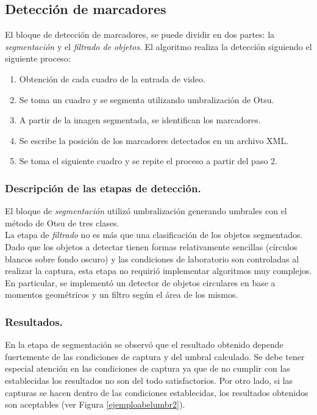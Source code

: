\subsection{Detección de marcadores}
El bloque de detección de marcadores, se puede dividir en dos partes: la \textit{segmentación} y el \textit{filtrado de objetos}.
%
El algoritmo realiza la detección siguiendo el siguiente proceso:
%
\begin{enumerate}
  \item Obtención de cada cuadro de la entrada de video.
  \item Se toma un cuadro y se segmenta utilizando umbralización de Otsu.
  \item A partir de la imagen segmentada, se identifican los marcadores.
  \item Se escribe la posición de los marcadores detectados en un archivo XML.
  \item Se toma el siguiente cuadro y se repite el proceso a partir del paso 2.
\end{enumerate}
\vspace{-0.4cm} 
\subsubsection{Descripción de las etapas de detección.}
El bloque de \textit{segmentación} utilizó umbralización generando umbrales con el método de Otsu\cite{otsu} de tres clases.\\
%
La etapa de \textit{filtrado} no es más que una clasificación de los objetos segmentados. Dado que los objetos a detectar tienen formas relativamente sencillas (círculos blancos sobre fondo oscuro) y las condiciones de laboratorio son controladas al realizar la captura, esta etapa no requirió implementar algoritmos muy complejos. En particular, se implementó un detector de objetos circulares en base a momentos geométricos\cite{imageMoments} y un filtro según el área de los mismos.
\vspace{-0.3cm} 
\subsubsection{Resultados.}
En la etapa de segmentación se observó que el resultado obtenido depende fuertemente de las condiciones de captura y del umbral calculado. Se debe tener especial atención en las condiciones de captura ya que de no cumplir con las establecidas los resultados no son del todo satisfactorios. Por otro lado, si las capturas se hacen dentro de las condiciones establecidas, los resultados obtenidos son aceptables (ver Figura \ref{ejemploabelumbr2}).

